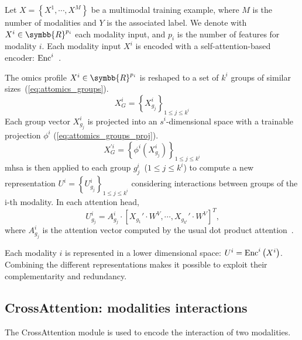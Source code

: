 \documentclass[../main.tex]{subfiles}
\begin{document}
     Let \( X = \left\{X^{1}, \cdots, X^{M} \right\} \) be a multimodal training example, where \(M\) is the number of modalities and \(Y\) is the associated label.
     We denote with \(X^{i} \in \symbb{R}^{p_i}\) each modality input, and $p_i$ is the number of features for modality $i$.
     Each modality input \(X^{i}\) is encoded with a self-attention-based encoder: \(\operatorname{Enc}^{i}\)~\cite{AttOmics}.

     The omics profile \(X^{i} \in \symbb{R}^{p_i} \) is reshaped to a set of $k^i$ groups of similar sizes~(\cref{eq:attomics_groups}).
     \begin{equation}
         X^{i}_{G} = \left\{X^{i}_{g_j} \right\}_{1\leq j\leq k^i}\label{eq:attomics_groups}
     \end{equation}
     Each group vector $X^{i}_{g_j}$ is projected into an $s^i$-dimensional space with a trainable projection \(\phi^i\) (\cref{eq:attomics_groups_proj}).
     \begin{equation}
         X^{'i}_{G} = \left\{\phi^i\left(X^{i}_{g_j} \right) \right\}_{1\leq j\leq k^i}\label{eq:attomics_groups_proj}
     \end{equation}
     \Gls{mhsa} is then applied to each group \(g^i_j\)~(\(1 \leq j \leq k^i \)) to compute a new representation \({U^i = \left\{ U^i_{g_j}\right\}_{1 \leq j \leq k^i}}\) considering interactions between groups of the i-th modality.
     In each attention head,
     \begin{equation}
         U^{i}_{g_j} = A^{i}_{g_j} \cdot \left[ X_{g_1}' \cdot W^V, \cdots ,  X_{g_{k^i}}' \cdot W^V\right]^T \text{,}\label{eq:enc_mhsa}
     \end{equation}
     where $A^{i}_{g_j}$ is the attention vector computed by the usual dot product attention~\cite{AttentionAllYouNeed}.

     Each modality $i$ is represented in a lower dimensional space: \(U^{i} = \operatorname{Enc}^{i}\left(X^{i}\right)\).
     Combining the different representations makes it possible to exploit their complementarity and redundancy.

 \subsection{CrossAttention: modalities interactions}
     The CrossAttention module is used to encode the interaction of two modalities.
\end{document}
